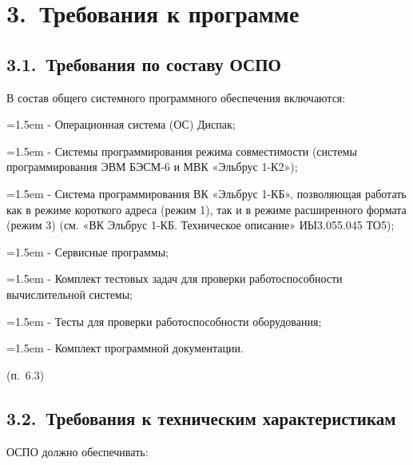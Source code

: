 \documentclass[11pt,a4paper]{article}
\begin{document}
\section*{3.~Требования к программе}
\subsection*{3.1.~Требования по составу ОСПО}
В состав общего системного программного обеспечения включаются:

\par\hangindent=1.5em - Операционная система (ОС) Диспак;\par
\par\hangindent=1.5em - Системы программирования режима совместимости (системы программирования ЭВМ БЭСМ-6 и МВК «Эльбрус 1-К2»);\par
\par\hangindent=1.5em - Система программирования ВК «Эльбрус 1-КБ», позволяющая работать как в режиме короткого адреса (режим 1), так и в режиме расширенного формата (режим 3) (см. «ВК Эльбрус 1-КБ. Техническое описание» ИЫ3.055.045 ТО5);\par
\par\hangindent=1.5em - Сервисные программы;\par
\par\hangindent=1.5em - Комплект тестовых задач для проверки работоспособности вычислительной системы;\par
\par\hangindent=1.5em - Тесты для проверки работоспособности оборудования;\par
\par\hangindent=1.5em - Комплект программной документации.\par
\begin{center}(п.~6.3)\end{center}
\subsection*{3.2.~Требования к техническим характеристикам}
ОСПО должно обеспечивать:
\end{document}
